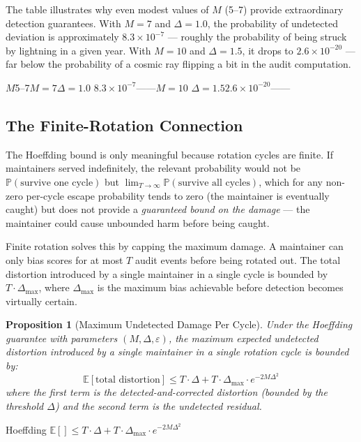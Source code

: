 \documentclass[12pt,a4paper]{article}
\newtheorem{proposition}[theorem]{Proposition}
\theoremstyle{remark}
\newcommand{\E}{\mathbb{E}}
\newcommand{\Pbb}{\mathbb{P}}
\begin{document}
\noindent The table illustrates why even modest values of $M$ (5--7) provide
extraordinary detection guarantees. With $M = 7$ and $\Delta = 1.0$, the
probability of undetected deviation is approximately $8.3 \times 10^{-7}$ —
roughly the probability of being struck by lightning in a given year. With
$M = 10$ and $\Delta = 1.5$, it drops to $2.6 \times 10^{-20}$ — far below
the probability of a cosmic ray flipping a bit in the audit computation.

\noindent\textbf{}
$M$5--7$M=7$$\Delta=1.0$
$8.3 \times 10^{-7}$——$M=10$
$\Delta=1.5$$2.6 \times 10^{-20}$——

\subsection{The Finite-Rotation Connection}

The Hoeffding bound is only meaningful because rotation cycles are finite. If
maintainers served indefinitely, the relevant probability would not be
$\Pbb(\text{survive one cycle})$ but
$\lim_{T \to \infty} \Pbb(\text{survive all cycles})$, which for any non-zero
per-cycle escape probability tends to zero (the maintainer is eventually caught)
but does not provide a \textit{guaranteed bound on the damage} — the maintainer
could cause unbounded harm before being caught.

Finite rotation solves this by capping the maximum damage. A maintainer can
only bias scores for at most $T$ audit events before being rotated out. The
total distortion introduced by a single maintainer in a single cycle is bounded
by $T \cdot \Delta_{\max}$, where $\Delta_{\max}$ is the maximum bias achievable
before detection becomes virtually certain.

\begin{proposition}[Maximum Undetected Damage Per Cycle]\label{prop:max_damage}
Under the Hoeffding guarantee with parameters $(M, \Delta, \varepsilon)$, the
maximum expected undetected distortion introduced by a single maintainer in a
single rotation cycle is bounded by:
\begin{equation}
    \E[\text{total distortion}] \leq T \cdot \Delta + T \cdot \Delta_{\max} \cdot e^{-2M\Delta^2}
\end{equation}
where the first term is the detected-and-corrected distortion (bounded by the
threshold $\Delta$) and the second term is the undetected residual.
\end{proposition}

\noindent\textbf{}
Hoeffding
$\E[\text{}] \leq T \cdot \Delta + T \cdot \Delta_{\max} \cdot e^{-2M\Delta^2}$
\end{document}
